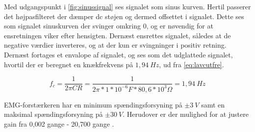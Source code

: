 Med udgangspunkt i \autoref{fig:sinussignal} ses signalet som sinus kurven. Hertil passerer det højpasfilteret der dæmper dc støjen og dermed offsettet i signalet. Dette ses som signalet sinuskurven der svinger omkring 0, og er nøvendig for at ensretningen viker efter hensigten. Dernæst ensrettes signalet, således at de negative værdier inverteres, og at der kun er svingninger i positiv retning. Dernæst fortages et envalope af signalet, og ses som det udglattede signalet, hvortil der er beregnet en knækfrekvens på $1,94~Hz$, ud fra \autoref{eq:lavcutfre}. 

\begin{equation}\label{eq:lavcutfre}
f_c = \frac{1}{2 \pi C R} = \frac{1}{2 \pi*1*10^{-6}F*80,6*10^3\Omega} = 1,94~Hz
\end{equation}

EMG-forstærkeren har en minimum spændingsforsyning på $\pm 3~V$ samt en maksimal spændingsforsyning på $\pm 30~V$. Herudover er der mulighed for at justere gain fra 0,002 gange - 20,700 gange \citep{advancertech2013}. 












